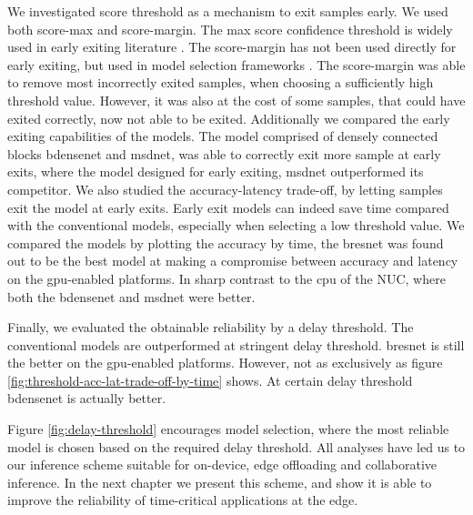 We investigated score threshold as a mechanism to exit samples early. We used both score-max and score-margin. The max score confidence threshold is widely used in early exiting literature \cite{leroux_resource-constrained_2015, leroux_cascading_2017, kaya_shallow-deep_nodate, berestizshevsky_sacrificing_2019}. The score-margin has not been used directly for early exiting, but used in model selection frameworks \cite{park_big/little_2015,tann_flexible_2018}. The score-margin was able to remove most incorrectly exited samples, when choosing a sufficiently high threshold value. However, it was also at the cost of some samples, that could have exited correctly, now not able to be exited. Additionally we compared the early exiting capabilities of the models. The model comprised of densely connected blocks \gls{bdensenet} and \gls{msdnet}, was able to correctly exit more sample at early exits, where the model designed for early exiting, \gls{msdnet} outperformed its competitor. We also studied the accuracy-latency trade-off, by letting samples exit the model at early exits. Early exit models can indeed save time compared with the conventional models, especially when selecting a low threshold value. We compared the models by plotting the accuracy by time, the \gls{bresnet} was found out to be the best model at making a compromise between accuracy and latency on the \gls{gpu}-enabled platforms. In sharp contrast to the \gls{cpu} of the NUC, where both the \gls{bdensenet} and \gls{msdnet} were better.

Finally, we evaluated the obtainable reliability by a delay threshold. The conventional models are outperformed at stringent delay threshold. \gls{bresnet} is still the better on the \gls{gpu}-enabled platforms. However, not as exclusively as figure \ref{fig:threshold-acc-lat-trade-off-by-time} shows. At certain delay threshold \gls{bdensenet} is actually better. 

Figure \ref{fig:delay-threshold} encourages model selection, where the most reliable model is chosen based on the required delay threshold. All analyses have led us to our inference scheme suitable for on-device, edge offloading and collaborative inference. In the next chapter we present this scheme, and show it is able to improve the reliability of time-critical applications at the edge.